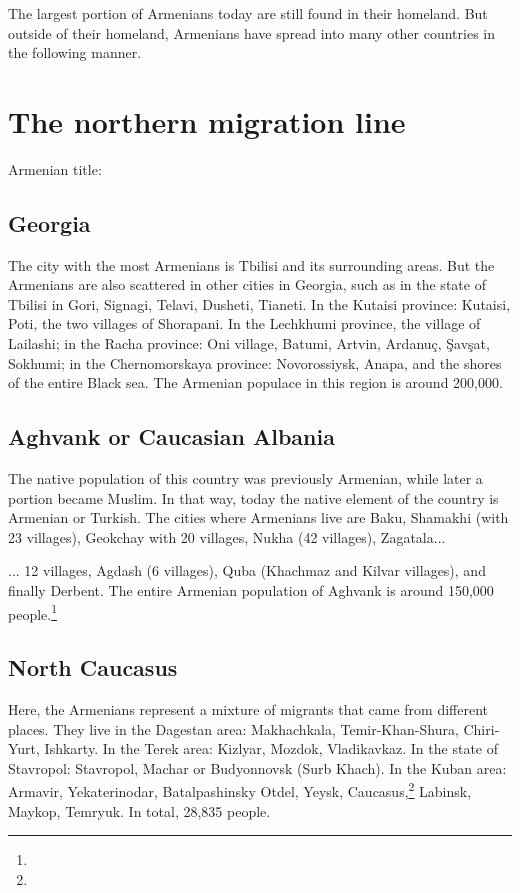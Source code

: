 The largest portion of Armenians today are still found in their homeland. But outside of their homeland, Armenians have spread into many other countries in the following manner. 


\section{The northern migration line}
Armenian title: 
\subsection{Georgia}

The city with the most Armenians is Tbilisi and its surrounding areas. But the Armenians are also scattered in other cities in Georgia, such as in the state of Tbilisi in Gori, Signagi, Telavi, Dusheti, Tianeti. In the Kutaisi province: Kutaisi, Poti, the two villages of Shorapani. In the Lechkhumi province, the village of Lailashi; in the Racha province: Oni village, Batumi, Artvin, Ardanuç, Şavşat, Sokhumi; in the Chernomorskaya province: Novorossiysk, Anapa, and the shores of the entire Black sea. The Armenian populace in this region is around 200,000. 
\subsection{Aghvank or Caucasian Albania}
The native population of this country was previously Armenian, while later a portion became  Muslim. In that way, today the native element of the country is Armenian or Turkish. The cities where Armenians live are Baku, Shamakhi (with 23 villages), Geokchay with 20 villages, Nukha (42 villages), Zagatala... 


\begin{adjarianpage}\label{page:26}\end{adjarianpage}%

... 12 villages, Agdash (6 villages), Quba (Khachmaz and Kilvar villages), and finally Derbent. The entire Armenian population of Aghvank is around 150,000 people.\footnote{}

\subsection{North Caucasus}

Here, the Armenians represent a mixture of migrants that came from different places. They live in the Dagestan area: Makhachkala, Temir-Khan-Shura, Chiri-Yurt, Ishkarty. In the Terek area: Kizlyar, Mozdok, Vladikavkaz. In the state of Stavropol: Stavropol, Machar or   Budyonnovsk (Surb Khach). In the Kuban area: Armavir, Yekaterinodar, Batalpashinsky Otdel, Yeysk, Caucasus,\footnote{} Labinsk, Maykop, Temryuk. In total, 28,835 people. 

